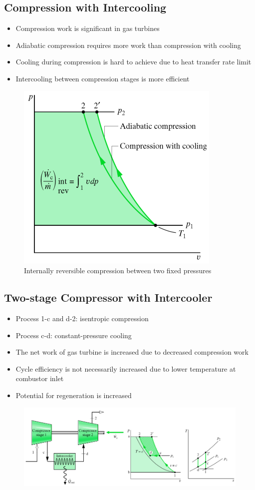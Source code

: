 \documentclass[class=report, crop=false, 12pt,a4paper]{standalone}
\numberwithin{equation}{section}
\begin{document}
\subsection{Compression with Intercooling}
\begin{itemize}[noitemsep]
  \item Compression work is significant in gas turbines
  \item Adiabatic compression requires more work than compression with cooling
  \item Cooling during compression is hard to achieve due to heat transfer rate limit
  \item Intercooling between compression stages is more efficient
\end{itemize}
\begin{figure}[H]
  \centering
  \includegraphics[width = 0.45 \textwidth]{../img/diagram170.png}
  \caption{Internally reversible compression between two fixed pressures}
\end{figure}
\subsection{Two-stage Compressor with Intercooler}
\begin{itemize}[noitemsep]
  \item Process 1-c and d-2: isentropic compression
  \item Process c-d: constant-pressure cooling
  \item The net work of gas turbine is increased due to decreased compression work
  \item Cycle efficiency is not necessarily increased due to lower temperature at combustor inlet
  \item Potential for regeneration is increased
\end{itemize}
\begin{figure}[H]
  \centering
  \includegraphics[width = 1 \textwidth]{../img/diagram171.png}
  \caption{}
\end{figure}
\end{document}
